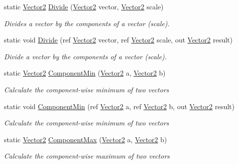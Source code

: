 \begin{DoxyCompactItemize}
static \hyperlink{struct_open_t_k_1_1_vector2}{Vector2} \hyperlink{struct_open_t_k_1_1_vector2_ae5c0056e17696cd93fcedd73461c2477}{Divide} (\hyperlink{struct_open_t_k_1_1_vector2}{Vector2} vector, \hyperlink{struct_open_t_k_1_1_vector2}{Vector2} scale)
\begin{DoxyCompactList}\small\item\em Divides a vector by the components of a vector (scale). \end{DoxyCompactList}\item 
static void \hyperlink{struct_open_t_k_1_1_vector2_af1ae6c35ea20e37ada003cadf0d5e626}{Divide} (ref \hyperlink{struct_open_t_k_1_1_vector2}{Vector2} vector, ref \hyperlink{struct_open_t_k_1_1_vector2}{Vector2} scale, out \hyperlink{struct_open_t_k_1_1_vector2}{Vector2} result)
\begin{DoxyCompactList}\small\item\em Divide a vector by the components of a vector (scale). \end{DoxyCompactList}\item 
static \hyperlink{struct_open_t_k_1_1_vector2}{Vector2} \hyperlink{struct_open_t_k_1_1_vector2_a2f1bc059d3c1908823fe89c8c4b516c4}{Component\-Min} (\hyperlink{struct_open_t_k_1_1_vector2}{Vector2} a, \hyperlink{struct_open_t_k_1_1_vector2}{Vector2} b)
\begin{DoxyCompactList}\small\item\em Calculate the component-\/wise minimum of two vectors \end{DoxyCompactList}\item 
static void \hyperlink{struct_open_t_k_1_1_vector2_a198941fa1887d67ad61d9f9a4c1443f9}{Component\-Min} (ref \hyperlink{struct_open_t_k_1_1_vector2}{Vector2} a, ref \hyperlink{struct_open_t_k_1_1_vector2}{Vector2} b, out \hyperlink{struct_open_t_k_1_1_vector2}{Vector2} result)
\begin{DoxyCompactList}\small\item\em Calculate the component-\/wise minimum of two vectors \end{DoxyCompactList}\item 
static \hyperlink{struct_open_t_k_1_1_vector2}{Vector2} \hyperlink{struct_open_t_k_1_1_vector2_a09e8ba013ed7287342df89b618eaf195}{Component\-Max} (\hyperlink{struct_open_t_k_1_1_vector2}{Vector2} a, \hyperlink{struct_open_t_k_1_1_vector2}{Vector2} b)
\begin{DoxyCompactList}\small\item\em Calculate the component-\/wise maximum of two vectors \end{DoxyCompactList}\item 

\end{DoxyCompactItemize}
